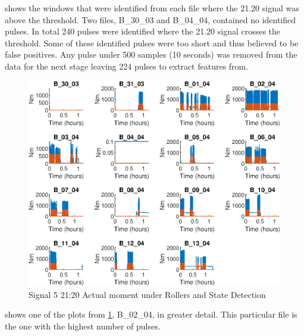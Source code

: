 \documentclass[]{article}
\begin{document}
 shows the windows that were identified from each file where the 21.20 signal was above the threshold. Two files, B\_30\_03 and B\_04\_04, contained no identified pulses. In total 240 pulses were identified where the 21.20 signal crosses the threshold. Some of these identified pulses were too short and thus believed to be false positives. Any pulse under 500 samples (10 seconds) was removed from the data for the next stage leaving 224 pulses to extract features from.

\begin{figure}[H]
    \centering
    \includegraphics[width=\textwidth, height=\textheight, keepaspectratio]{figures/StateDetectionFig.eps}
    \caption{Signal 5 21:20 Actual moment under Rollers and State Detection}
    \label{fig:StateDetection}
\end{figure}

 shows one of the plots from \cref{fig:StateDetection}, B\_02\_04, in greater detail. This particular file is the one with the highest number of pulses.
\end{document}
